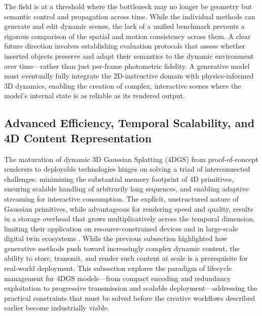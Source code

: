 \documentclass[11pt,a4paper]{article}
\begin{document}
The field is at a threshold where the bottleneck may no longer be geometry but semantic control and propagation across time. While the individual methods can generate and edit dynamic scenes, the lack of a unified benchmark prevents a rigorous comparison of the spatial and motion consistency across them. A clear future direction involves establishing evaluation protocols that assess whether inserted objects preserve and adapt their semantics to the dynamic environment over time---rather than just per-frame photometric fidelity. A generative model must eventually fully integrate the 2D-instructive domain with physics-informed 3D dynamics, enabling the creation of complex, interactive scenes where the model's internal state is as reliable as its rendered output.


\subsection{Advanced Efficiency, Temporal Scalability, and 4D Content Representation}


The maturation of dynamic 3D Gaussian Splatting (4DGS) from proof-of-concept renderers to deployable technologies hinges on solving a triad of interconnected challenges: minimizing the substantial memory footprint of 4D primitives, ensuring scalable handling of arbitrarily long sequences, and enabling adaptive streaming for interactive consumption. The explicit, unstructured nature of Gaussian primitives, while advantageous for rendering speed and quality, results in a storage overhead that grows multiplicatively across the temporal dimension, limiting their application on resource-constrained devices and in large-scale digital twin ecosystems \cite{arxiv:2310.08528v2,arxiv:2507.17336v3}. While the previous subsection highlighted how generative methods push toward increasingly complex dynamic content, the ability to store, transmit, and render such content at scale is a prerequisite for real-world deployment. This subsection explores the paradigm of lifecycle management for 4DGS models---from compact encoding and redundancy exploitation to progressive transmission and scalable deployment---addressing the practical constraints that must be solved before the creative workflows described earlier become industrially viable.
\end{document}
